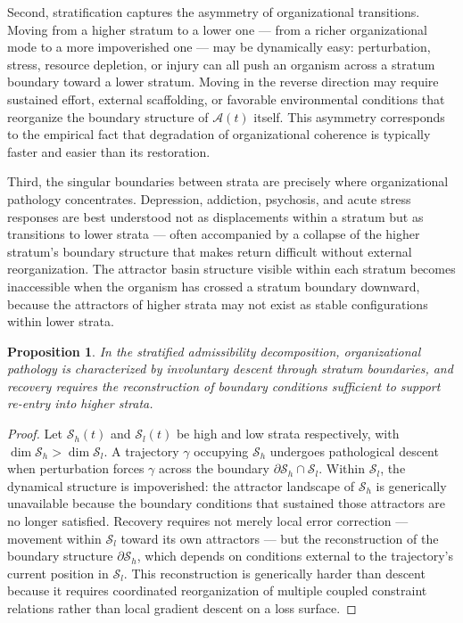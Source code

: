 \documentclass[12pt,a4paper]{report}
\theoremstyle{flyxion}
\newtheorem{proposition}[theorem]{Proposition}
\begin{document}
Second, stratification captures the asymmetry of organizational transitions. Moving from a higher stratum to a lower one --- from a richer organizational mode to a more impoverished one --- may be dynamically easy: perturbation, stress, resource depletion, or injury can all push an organism across a stratum boundary toward a lower stratum. Moving in the reverse direction may require sustained effort, external scaffolding, or favorable environmental conditions that reorganize the boundary structure of $\mathcal{A}(t)$ itself. This asymmetry corresponds to the empirical fact that degradation of organizational coherence is typically faster and easier than its restoration.

Third, the singular boundaries between strata are precisely where organizational pathology concentrates. Depression, addiction, psychosis, and acute stress responses are best understood not as displacements within a stratum but as transitions to lower strata --- often accompanied by a collapse of the higher stratum's boundary structure that makes return difficult without external reorganization. The attractor basin structure visible within each stratum becomes inaccessible when the organism has crossed a stratum boundary downward, because the attractors of higher strata may not exist as stable configurations within lower strata.

\begin{proposition}
In the stratified admissibility decomposition, organizational pathology is characterized by involuntary descent through stratum boundaries, and recovery requires the reconstruction of boundary conditions sufficient to support re-entry into higher strata.
\end{proposition}

\begin{proof}
Let $\mathcal{S}_h(t)$ and $\mathcal{S}_l(t)$ be high and low strata respectively, with $\dim \mathcal{S}_h > \dim \mathcal{S}_l$. A trajectory $\gamma$ occupying $\mathcal{S}_h$ undergoes pathological descent when perturbation forces $\gamma$ across the boundary $\partial \mathcal{S}_h \cap \mathcal{S}_l$. Within $\mathcal{S}_l$, the dynamical structure is impoverished: the attractor landscape of $\mathcal{S}_h$ is generically unavailable because the boundary conditions that sustained those attractors are no longer satisfied. Recovery requires not merely local error correction --- movement within $\mathcal{S}_l$ toward its own attractors --- but the reconstruction of the boundary structure $\partial \mathcal{S}_h$, which depends on conditions external to the trajectory's current position in $\mathcal{S}_l$. This reconstruction is generically harder than descent because it requires coordinated reorganization of multiple coupled constraint relations rather than local gradient descent on a loss surface.
\end{proof}
\end{document}
